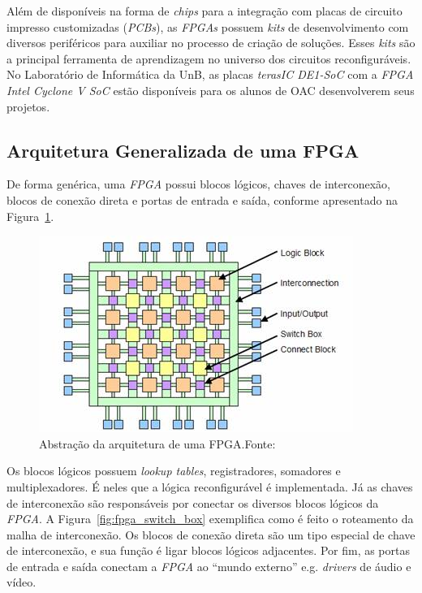 { Além de disponíveis na forma de \textit{chips} para a integração com placas
    de circuito impresso customizadas (\textit{PCBs}), as \textit{FPGAs} possuem
    \textit{kits} de desenvolvimento com diversos periféricos para auxiliar no
    processo de criação de soluções. Esses \textit{kits} são a principal ferramenta
    de aprendizagem no universo dos circuitos reconfiguráveis. No Laboratório de
    Informática da UnB, as placas \textit{terasIC DE1-SoC} com a \textit{FPGA
    Intel Cyclone V SoC} estão disponíveis para os alunos de OAC desenvolverem
    seus projetos.
}

    \subsection{Arquitetura Generalizada de uma FPGA}
    { De forma genérica, uma \textit{FPGA} possui blocos lógicos, chaves de
        interconexão, blocos de conexão direta e portas de entrada e saída,
        conforme apresentado na Figura~\ref{fig:fpga_general_arch}.
    }

    \begin{figure}[H]
    \centering
    \includegraphics[width=.7\linewidth]
        {../images/fpga_architecture_abstraction_-_olin_college.jpg}
        \caption[Abstração da arquitetura de uma FPGA]
            {Abstração da arquitetura de uma FPGA.\quad Fonte:~\cite{fpga_arch_abstraction}}
        \label{fig:fpga_general_arch}
    \end{figure}

    { Os blocos lógicos possuem \textit{lookup tables}, registradores, somadores
        e multiplexadores. É neles que a lógica reconfigurável é implementada.
        Já as chaves de interconexão são responsáveis por conectar os diversos
        blocos lógicos da \textit{FPGA}. A Figura~\ref{fig:fpga_switch_box} exemplifica
        como é feito o roteamento da malha de interconexão. Os blocos de conexão
        direta são um tipo especial de chave de interconexão, e sua função é ligar
        blocos lógicos adjacentes. Por fim, as portas de entrada e saída conectam
        a \textit{FPGA} ao ``mundo externo'' e.g. \textit{drivers} de áudio e vídeo.
    }

